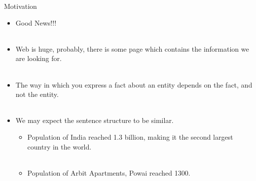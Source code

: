 \documentclass{beamer}
\begin{document}
\begin{frame}{Motivation}

\begin{itemize}
 \item  Good News!!! \pause \\~\\
 \item  Web is huge, probably, there is some page which contains the information we are looking for. \pause \\~\\
 \item The way in which you express a fact about an entity depends on the fact, and not the entity. \pause \\~\\
 \item We may expect the sentence structure to be similar. \pause
 \begin{itemize}
    \item Population of India reached 1.3 billion, making it the second largest country in the world. \pause \\~\\
    \item Population of Arbit Apartments, Powai reached 1300.
 \end{itemize}
 
\end{itemize}
\end{frame}
\end{document}
